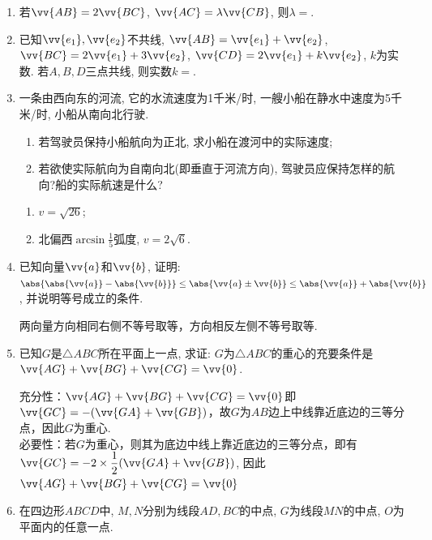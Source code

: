 \begin{enumerate}
\begin{jieda}
        $\left\{\begin{array}{l}
             \vv{AB} + \vv{AD} = \vv{a} \\
             \vv{AB} - \vv{AD} = \vv{b}
        \end{array} \right.$
    \end{jieda}
    \item 若$\vv{AB}=2\vv{BC}$, $\vv{AC}=\lambda\vv{CB}$, 则$\lambda=$. 
    \item 已知$\vv{e_1},\vv{e_2}$不共线, $\vv{AB}=\vv{e_1}+\vv{e_2}$, $\vv{BC}=2\vv{e_1}+3\vv{e_2}$, $\vv{CD}=2\vv{e_1}+k\vv{e_2}$, $k$为实数. 
    若$A,B,D$三点共线, 则实数$k=$. 
    \item 一条由西向东的河流, 它的水流速度为1千米/时, 一艘小船在静水中速度为5千米/时, 小船从南向北行驶. 
    \begin{enumerate}[(1)]
    \item 若驾驶员保持小船航向为正北, 求小船在渡河中的实际速度;
    \item 若欲使实际航向为自南向北(即垂直于河流方向), 驾驶员应保持怎样的航向?船的实际航速是什么? 
    \end{enumerate}
    \begin{jieda}
    \begin{enumerate}[(1)]
    \item $v=\sqrt{26}$; 
    \item 北偏西$\arcsin\frac{1}{5}$弧度, $v=2\sqrt{6}$. 
    \end{enumerate}
    \end{jieda}
    \item 已知向量$\vv{a}$和$\vv{b}$, 证明: $\abs{\abs{\vv{a}}-\abs{\vv{b}}}\leq\abs{\vv{a}\pm\vv{b}}\leq\abs{\vv{a}}+\abs{\vv{b}}$, 并说明等号成立的条件. 
    \begin{jieda}
        两向量方向相同右侧不等号取等，方向相反左侧不等号取等.
    \end{jieda}    
    \item 已知$G$是$\triangle{ABC}$所在平面上一点, 求证: $G$为$\triangle{ABC}$的重心的充要条件是$\vv{AG}+\vv{BG}+\vv{CG}=\vv{0}$. 
    \begin{jieda}
        充分性：$\vv{AG}+\vv{BG}+\vv{CG}=\vv{0}$即$\vv{GC} = -(\vv{GA} + \vv{GB})$，故$G$为$AB$边上中线靠近底边的三等分点，因此$G$为重心. \\
        必要性：若$G$为重心，则其为底边中线上靠近底边的三等分点，即有$\vv{GC} = -2\times \dfrac{1}{2}(\vv{GA} + \vv{GB})$, 因此$\vv{AG}+\vv{BG}+\vv{CG}=\vv{0}$
    \end{jieda}
    \item 在四边形$ABCD$中, $M,N$分别为线段$AD,BC$的中点, $G$为线段$MN$的中点, $O$为平面内的任意一点. 

\end{enumerate}
